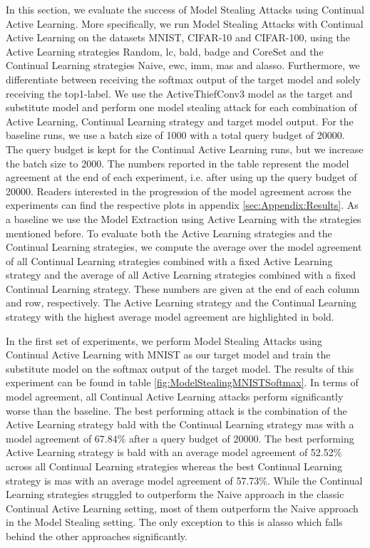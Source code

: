 In this section, we evaluate the success of Model Stealing Attacks using Continual Active Learning. More specifically, we run Model Stealing Attacks with Continual Active Learning on the datasets MNIST, CIFAR-10 and CIFAR-100, using the Active Learning strategies
Random, \gls{lc}, \gls{bald}, \gls{badge} and CoreSet and the Continual Learning strategies Naive, \gls{ewc}, \gls{imm}, \gls{mas} and \gls{alasso}. Furthermore, we differentiate between receiving the softmax output of the target model and solely receiving the top1-label. We use the ActiveThiefConv3 model
as the target and substitute model and perform one model stealing attack for each combination of Active Learning, Continual Learning strategy and target model output. For the baseline runs, we use a batch size of 1000 with a total query budget of 20000. The query budget
is kept for the Continual Active Learning runs, but we increase the batch size to 2000. The numbers reported in the table represent the model agreement at the end of each experiment, i.e. after using up the query budget of 20000. Readers interested in the progression of the
model agreement across the experiments can find the respective plots in appendix \ref{sec:Appendix:Results}. As a baseline we use the Model Extraction using Active Learning with the strategies mentioned before. To evaluate both the Active Learning strategies and the Continual
Learning strategies, we compute the average over the model agreement of all Continual Learning strategies combined with a fixed Active Learning strategy and the average of all Active Learning strategies combined with a fixed Continual Learning strategy. These numbers are given
at the end of each column and row, respectively. The Active Learning strategy and the Continual Learning strategy with the highest average model agreement are highlighted in bold. \par
In the first set of experiments, we perform Model Stealing Attacks using Continual Active Learning with MNIST as our target model and train the substitute model on the softmax output of the target model. The results of this experiment can be found in table
\ref{fig:ModelStealingMNISTSoftmax}. In terms of model agreement, all Continual Active Learning attacks perform significantly worse than the baseline. The best performing attack is the combination of the Active Learning strategy \gls{bald} with the Continual Learning strategy
\gls{mas} with a model agreement of 67.84\% after a query budget of 20000. The best performing Active Learning strategy is \gls{bald} with an average model agreement of 52.52\% across all Continual Learning strategies whereas the best Continual Learning strategy is \gls{mas} with an average
model agreement of 57.73\%. While the Continual Learning strategies struggled to outperform the Naive approach in the classic Continual Active Learning setting, most of them outperform the Naive approach in the Model Stealing setting. The only exception to this is \gls{alasso} which
falls behind the other approaches significantly. \par 

